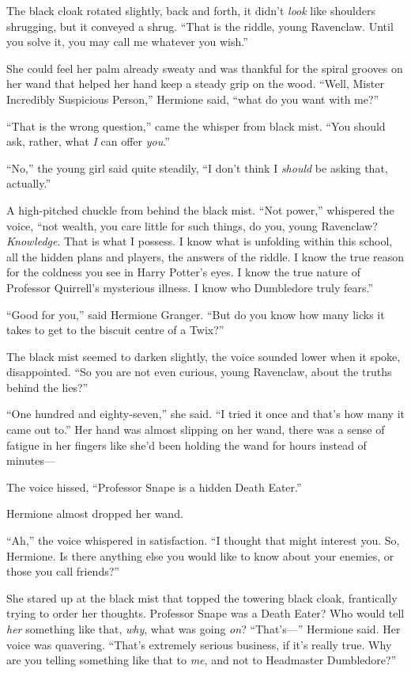 The black cloak rotated slightly, back and forth, it didn’t \emph{look} like shoulders shrugging, but it conveyed a shrug. “That is the riddle, young Ravenclaw. Until you solve it, you may call me whatever you wish.”

She could feel her palm already sweaty and was thankful for the spiral grooves on her wand that helped her hand keep a steady grip on the wood. “Well, Mister Incredibly Suspicious Person,” Hermione said, “what do you want with me?”

“That is the wrong question,” came the whisper from black mist. “You should ask, rather, what \emph{I} can offer \emph{you}.”

“No,” the young girl said quite steadily, “I don’t think I \emph{should} be asking that, actually.”

A high-pitched chuckle from behind the black mist. “Not power,” whispered the voice, “not wealth, you care little for such things, do you, young Ravenclaw? \emph{Knowledge}. That is what I possess. I know what is unfolding within this school, all the hidden plans and players, the answers of the riddle. I know the true reason for the coldness you see in Harry Potter’s eyes. I know the true nature of Professor Quirrell’s mysterious illness. I know who Dumbledore truly fears.”

“Good for you,” said Hermione Granger. “But do you know how many licks it takes to get to the biscuit centre of a Twix?”

The black mist seemed to darken slightly, the voice sounded lower when it spoke, disappointed. “So you are not even curious, young Ravenclaw, about the truths behind the lies?”

“One hundred and eighty-seven,” she said. “I tried it once and that’s how many it came out to.” Her hand was almost slipping on her wand, there was a sense of fatigue in her fingers like she’d been holding the wand for hours instead of minutes—

The voice hissed, “Professor Snape is a hidden Death Eater.”

Hermione almost dropped her wand.

“Ah,” the voice whispered in satisfaction. “I thought that might interest you. So, Hermione. Is there anything else you would like to know about your enemies, or those you call friends?”

She stared up at the black mist that topped the towering black cloak, frantically trying to order her thoughts. Professor Snape was a Death Eater? Who would tell \emph{her} something like that, \emph{why}, what was going \emph{on}? “That’s—” Hermione said. Her voice was quavering. “That’s extremely serious business, if it’s really true. Why are you telling something like that to \emph{me}, and not to Headmaster Dumbledore?”

